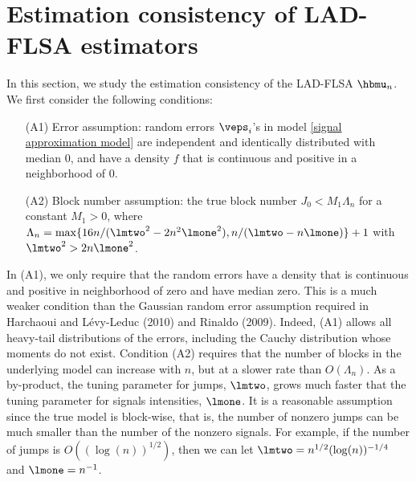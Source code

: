 \documentclass[12pt]{article}
\begin{document}
 \section{Estimation consistency of LAD-FLSA estimators}\label{est-con}
In this section, we study the estimation consistency of the LAD-FLSA  $\hbmu_n$.
We first consider the following conditions:
 \begin{itemize}
 \item[(A1)] Error assumption: random errors $\veps_i$'s in model
 \eqref{signal approximation model} are independent and
identically distributed with median $0$, and have a density $f$ that is continuous and positive %
in a neighborhood of $0$.
\item[(A2)] Block number assumption: the true block number $J_0<M_1\Lambda_n$ for a constant $M_1 > 0$, where
$\Lambda_n=\max\{16n/(\lmtwo^2-2n^2\lmone^2), n/(\lmtwo-n\lmone)\}+1$ with $\lmtwo^2>2n\lmone^2$.
\end{itemize}
In (A1), we only require that the random errors have a density that
is continuous and positive in neighborhood of zero and have median
zero. This is a much weaker condition than the  Gaussian random error
assumption required in Harchaoui and L\'{e}vy-Leduc (2010) and Rinaldo (2009). Indeed, (A1) allows all heavy-tail distributions of the errors,
including the Cauchy distribution whose moments do not exist.
Condition (A2) requires that the number of blocks in the underlying model can increase
with $n$, but at a slower rate than $O(\Lambda_n)$.
As a by-product, the tuning parameter for jumps, $\lmtwo$, grows much faster that the tuning parameter
for signals intensities, $\lmone$.  It is a reasonable  assumption since the true model is block-wise, that
 is, the number of nonzero jumps can be much smaller than the number of the nonzero signals.
For example, if the number of jumps is  $O((\log(n))^{1/2})$,
then we can let $\lmtwo=n^{1/2}(\log(n))^{-1/4}$ and $\lmone=n^{-1}$.

\end{document}
